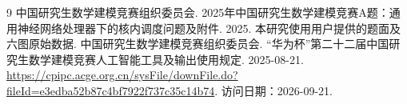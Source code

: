 \begin{thebibliography}{9}
 中国研究生数学建模竞赛组织委员会. 2025年中国研究生数学建模竞赛A题：通用神经网络处理器下的核内调度问题及附件. 2025. 本研究使用用户提供的题面及六图原始数据.
 中国研究生数学建模竞赛组织委员会. “华为杯”第二十二届中国研究生数学建模竞赛人工智能工具及输出使用规定. 2025-08-21. \url{https://cpipc.acge.org.cn/sysFile/downFile.do?fileId=e3edba52b87c4bf7922f737c35c14b74}. 访问日期：2026-09-21.
\end{thebibliography}
